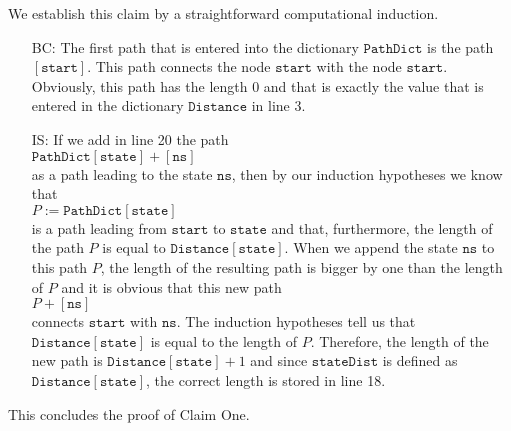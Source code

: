 \noindent
We establish this claim by a straightforward computational induction.  
\begin{enumerate}
\item[BC:] The first path that is entered into the dictionary $\texttt{PathDict}$ is the path
           $[\texttt{start}]$.  This path connects the node $\texttt{start}$ with the node $\texttt{start}$.
           Obviously, this path has the length $0$ and that is exactly the value that is entered in the
           dictionary $\texttt{Distance}$ in line 3.
\item[IS:] If we add in line 20 the path
           \\[0.2cm]
           \hspace*{1.3cm}
           $\texttt{PathDict}[\texttt{state}] + [\texttt{ns}]$
           \\[0.2cm]
           as a path leading to the state $\texttt{ns}$, then by our induction hypotheses we know that
           \\[0.2cm]
           \hspace*{1.3cm}
           $P := \texttt{PathDict}[\texttt{state}]$ 
           \\[0.2cm]
           is a path leading from $\texttt{start}$ to $\texttt{state}$ and
           that, furthermore, the length of the path $P$ is equal to $\texttt{Distance}[\texttt{state}]$.  When
           we append the state $\texttt{ns}$ to this path $P$, the length of the resulting path is
           bigger by one than the length of $P$ and it is obvious that this new path 
           \\[0.2cm]
           \hspace*{1.3cm}
           $P + [\texttt{ns}]$
           \\[0.2cm]
           connects $\texttt{start}$ with $\texttt{ns}$.  The induction hypotheses tell us that
           $\texttt{Distance}[\texttt{state}]$ is equal to the length of $P$.  Therefore, the length of the new
           path is $\texttt{Distance}[\texttt{state}] + 1$ and since $\texttt{stateDist}$ is defined as
           $\texttt{Distance}[\texttt{state}]$, the correct length is stored in line 18.
\end{enumerate}
This concludes the proof of Claim One. 
\vspace*{0.2cm}

